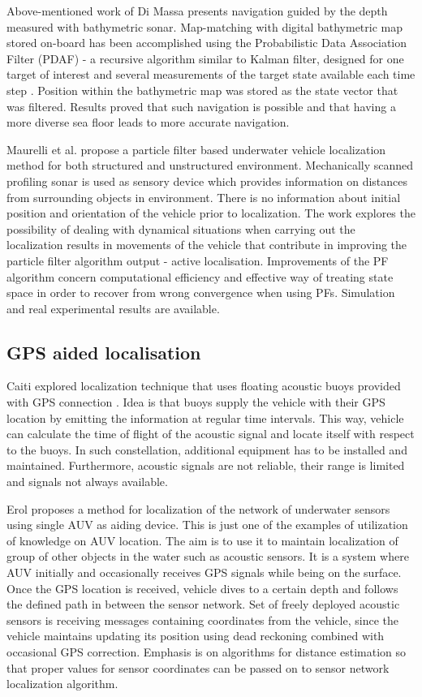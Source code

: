 Above-mentioned work of Di Massa \cite{diMassa97} presents navigation guided by the depth measured with bathymetric sonar. Map-matching with digital bathymetric map stored on-board has been accomplished using the Probabilistic Data Association Filter (PDAF) - a recursive algorithm similar to Kalman filter, designed for one target of interest and several measurements of the target state available each time step \cite{diMassa97}. Position within the bathymetric map was stored as the state vector that was filtered. Results proved that such navigation is possible and that having a more diverse sea floor leads to more accurate navigation.

Maurelli et al. \cite{maurelli08} propose a particle filter based underwater vehicle localization method for both structured and unstructured environment. Mechanically scanned profiling sonar is used as sensory device which provides information on distances from surrounding objects in environment. There is no information about initial position and orientation of the vehicle prior to localization. The work explores the possibility of dealing with dynamical situations when carrying out the localization results in movements of the vehicle that contribute in improving the particle filter algorithm output - active localisation. Improvements of the PF algorithm concern computational efficiency and effective way of treating state space in order to recover from wrong convergence when using PFs. Simulation and real experimental results are available.

\subsection{GPS aided localisation}
Caiti explored localization technique that uses floating acoustic buoys provided with GPS connection \cite{caiti05}. Idea is that buoys supply the vehicle with their GPS location by emitting the information at regular time intervals. This way, vehicle can calculate the time of flight of the acoustic signal and locate itself with respect to the buoys. In such constellation, additional equipment has to be installed and maintained. Furthermore, acoustic signals are not reliable, their range is limited and signals not always available. 

Erol \cite{erol07} proposes a method for localization of the network of underwater sensors using single AUV as aiding device. This is just one of the examples of utilization of knowledge on AUV location. The aim is to use it to maintain localization of group of other objects in the water such as acoustic sensors. It is a system where AUV initially and occasionally receives GPS signals while being on the surface. Once the GPS location is received, vehicle dives to a certain depth and follows the defined path in between the sensor network. Set of freely deployed acoustic sensors is receiving messages containing coordinates from the vehicle, since the vehicle maintains updating its position using dead reckoning combined with occasional GPS correction. Emphasis is on algorithms for distance estimation so that proper values for sensor coordinates can be passed on to sensor network localization algorithm.
